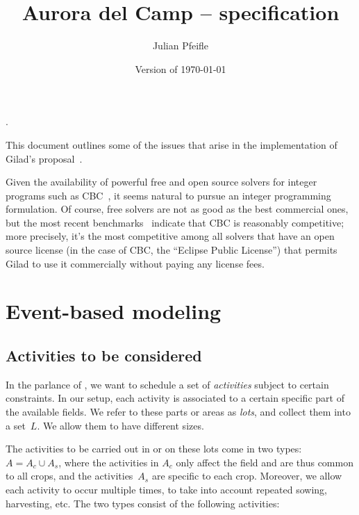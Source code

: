\documentclass[11pt]{amsart}
\numberwithin{equation}{section}
\begin{document}
\renewcommand*\descriptionlabel[1]{%
\hspace\labelsep\normalfont\itshape #1:}.

\title{Aurora del Camp -- specification}
\author{Julian Pfeifle}
\date{Version of \today}
\maketitle

This document outlines some of the issues that arise in the
implementation of Gilad's proposal~\cite{buzi11}.

\medskip
Given the availability of powerful free and open source solvers for
integer programs such as CBC~\cite{cbc}, it seems natural to pursue an
integer programming formulation. Of course, free solvers are not as
good as the best commercial ones, but the most recent
benchmarks~\cite{mittelmann11} indicate that CBC is reasonably
competitive; more precisely, it's the most competitive among all
solvers that have an open source license (in the case of CBC, the
``Eclipse Public License'') that permits Gilad to use it commercially
without paying any license fees.

\section{Event-based modeling}


\subsection{Activities to be considered}

In the parlance of \cite{artigues-etal11}, we want to schedule a set
of \emph{activities} subject to certain constraints. In our setup,
each activity is associated to a certain specific part of the
available fields. We refer to these parts or areas as \emph{lots}, and
collect them into a set~$L$. We allow them to have different
sizes.

The activities to be carried out in or on these lots come in two
types: $A=A_c\cup A_s$, where the activities in $A_c$ only affect the
field and are thus common to all crops, and the activities~$A_s$ are
specific to each crop. Moreover, we allow each activity to occur
multiple times, to take into account repeated sowing, harvesting,
etc. The two types consist of the following activities:
\end{document}
